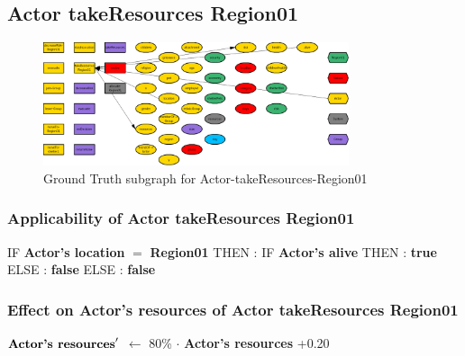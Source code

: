 \documentclass{article}%
\begin{document}
%
\subsection{Actor takeResources Region01}%
\label{subsec:Actor takeResources Region01}%


\begin{figure}[ht]%
\centering%
\includegraphics[width=0.8\textwidth]{images/Actor-takeResources-Region01.png}%
\caption{Ground Truth subgraph for Actor{-}takeResources{-}Region01}%
\end{figure}

%
\subsubsection{Applicability of Actor takeResources Region01}%
\label{ssubsec:Applicability of Actor takeResources Region01}%
\begin{flushleft}%
IF %
\textbf{Actor's location}%
$=$%
\textbf{Region01}%
\linebreak%
\hspace*{2em}%
THEN %
: %
IF %
\textbf{Actor's alive}%
\linebreak%
\hspace*{4em}%
THEN %
: %
\textbf{true}%
\linebreak%
\hspace*{4em}%
ELSE %
: %
\textbf{false}%
\linebreak%
\hspace*{2em}%
ELSE %
: %
\textbf{false}%
\end{flushleft}

%
\subsubsection{Effect on Actor's resources of Actor takeResources Region01}%
\label{ssubsec:Effect on Actor's resources of Actor takeResources Region01}%
\begin{flushleft}%
$\mbox{\textbf{Actor's resources}} '$%
$\leftarrow$%
80\%%
$\cdot$%
\textbf{Actor's resources}%
+0.20%
\end{flushleft}
\end{document}
